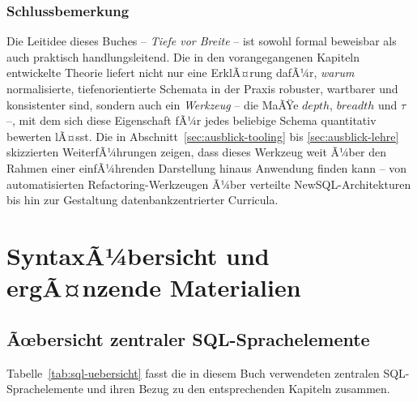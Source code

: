 ﻿\documentclass[a4paper,12pt]{report}
\theoremstyle{definition}
\theoremstyle{remark}
\newcommand{\depth}{\mathit{depth}}
\newcommand{\breadth}{\mathit{breadth}}
\begin{document}
\subsection{Schlussbemerkung}

Die Leitidee dieses Buches -- \emph{Tiefe vor Breite} -- ist sowohl
formal beweisbar als auch praktisch handlungsleitend. Die in den
vorangegangenen Kapiteln entwickelte Theorie liefert nicht nur eine
ErklÃ¤rung dafÃ¼r, \emph{warum} normalisierte, tiefenorientierte Schemata
in der Praxis robuster, wartbarer und konsistenter sind, sondern auch
ein \emph{Werkzeug} -- die MaÃŸe $\depth$, $\breadth$ und $\tau$ --, mit
dem sich diese Eigenschaft fÃ¼r jedes beliebige Schema quantitativ
bewerten lÃ¤sst. Die in Abschnitt~\ref{sec:ausblick-tooling} bis
\ref{sec:ausblick-lehre} skizzierten WeiterfÃ¼hrungen zeigen, dass dieses
Werkzeug weit Ã¼ber den Rahmen einer einfÃ¼hrenden Darstellung hinaus
Anwendung finden kann -- von automatisierten Refactoring-Werkzeugen Ã¼ber
verteilte NewSQL-Architekturen bis hin zur Gestaltung
datenbankzentrierter Curricula.


\appendix
\chapter{SyntaxÃ¼bersicht und ergÃ¤nzende Materialien}

\section{Ãœbersicht zentraler SQL-Sprachelemente}

Tabelle~\ref{tab:sql-uebersicht} fasst die in diesem Buch verwendeten
zentralen SQL-Sprachelemente und ihren Bezug zu den entsprechenden
Kapiteln zusammen.
\end{document}
